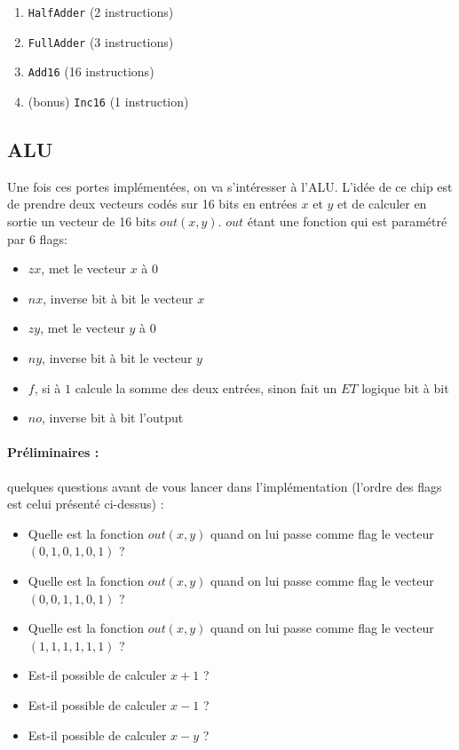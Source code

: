 \documentclass[11pt]{article}
\begin{document}
\begin{enumerate}
\item \texttt{HalfAdder} (2 instructions)
\item \texttt{FullAdder} (3 instructions)
\item \texttt{Add16} (16 instructions)
\item (bonus) \texttt{Inc16} (1 instruction)
\end{enumerate}

\subsection*{ALU}

Une fois ces portes implémentées, on va s'intéresser à l'ALU. L'idée de ce chip est de prendre deux vecteurs codés sur 16 bits en entrées \(x\) et \(y\) et de calculer en sortie un vecteur de 16 bits \(out(x,y)\). \(out\) étant une fonction qui est paramétré par \(6\) flags:
\begin{itemize}
\item \(zx\), met le vecteur \(x\) à \(0\)
\item \(nx\), inverse bit à bit le vecteur \(x\)
\item \(zy\), met le vecteur \(y\) à \(0\)
\item \(ny\), inverse bit à bit le vecteur \(y\)
\item \(f\), si à \(1\) calcule la somme des deux entrées, sinon fait un \(ET\) logique bit à bit
\item \(no\), inverse bit à bit l'output
\end{itemize}

\paragraph{Préliminaires :} quelques questions avant de vous lancer dans l'implémentation (l'ordre des flags est celui présenté ci-dessus) :
\begin{itemize}
\item Quelle est la fonction \(out(x,y)\) quand on lui passe comme flag le vecteur \((0,1,0,1,0,1)\) ?
\item Quelle est la fonction \(out(x,y)\) quand on lui passe comme flag le vecteur \((0,0,1,1,0,1)\) ?
\item Quelle est la fonction \(out(x,y)\) quand on lui passe comme flag le vecteur \((1,1,1,1,1,1)\) ?
\item Est-il possible de calculer \(x+1\) ?
\item Est-il possible de calculer \(x-1\) ?
\item Est-il possible de calculer \(x-y\) ?
\end{itemize}
\end{document}
